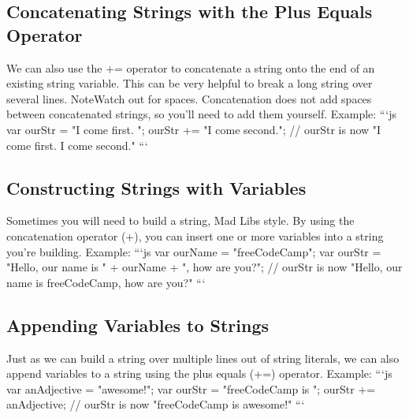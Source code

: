 \documentclass{article}%
\begin{document}
\subsection{Concatenating Strings with the Plus Equals Operator}%
\label{subsec:ConcatenatingStringswiththePlusEqualsOperator}%
We can also use the += operator to concatenate a string onto the end of an existing string variable. This can be very helpful to break a long string over several lines.\newline%
NoteWatch out for spaces. Concatenation does not add spaces between concatenated strings, so you'll need to add them yourself.\newline%
Example:\newline%
```js\newline%
var ourStr = "I come first. ";\newline%
ourStr += "I come second.";\newline%
// ourStr is now "I come first. I come second."\newline%
```\newline%

%
\subsection{Constructing Strings with Variables}%
\label{subsec:ConstructingStringswithVariables}%
Sometimes you will need to build a string, Mad Libs style. By using the concatenation operator (+), you can insert one or more variables into a string you're building.\newline%
Example:\newline%
```js\newline%
var ourName = "freeCodeCamp";\newline%
var ourStr = "Hello, our name is " + ourName + ", how are you?";\newline%
// ourStr is now "Hello, our name is freeCodeCamp, how are you?"\newline%
```\newline%

%
\subsection{Appending Variables to Strings}%
\label{subsec:AppendingVariablestoStrings}%
Just as we can build a string over multiple lines out of string literals, we can also append variables to a string using the plus equals (+=) operator.\newline%
Example:\newline%
```js\newline%
var anAdjective = "awesome!";\newline%
var ourStr = "freeCodeCamp is ";\newline%
ourStr += anAdjective;\newline%
// ourStr is now "freeCodeCamp is awesome!"\newline%
```\newline%
\end{document}
